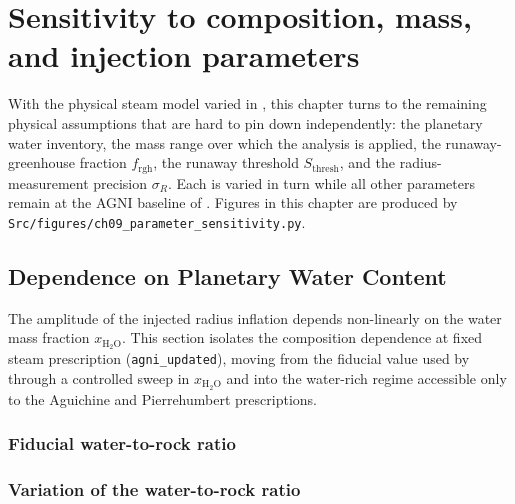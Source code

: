 \chapter{Sensitivity to composition, mass, and injection parameters}
\label{chap:parameter_sensitivity}

With the physical steam model varied in ,
this chapter turns to the remaining physical assumptions that are hard
to pin down independently: the planetary water inventory, the mass
range over which the analysis is applied, the runaway-greenhouse
fraction $f_\mathrm{rgh}$, the runaway threshold
$S_\mathrm{thresh}$, and the radius-measurement precision
$\sigma_R$.  Each is varied in turn while all other parameters remain
at the AGNI baseline of .  Figures in this chapter
are produced by \texttt{Src/figures/ch09\_parameter\_sensitivity.py}.


\section{Dependence on Planetary Water Content}
\label{sec:composition_dependence}

The amplitude of the injected radius inflation depends non-linearly on the
water mass fraction $x_{\mathrm{H_2O}}$.  This section isolates the
composition dependence at fixed steam prescription
(\texttt{agni\_updated}), moving from the fiducial value used by
\textcite{Schlecker2024} through a controlled sweep in
$x_{\mathrm{H_2O}}$ and into the water-rich regime accessible only to the
Aguichine and Pierrehumbert prescriptions.


\subsection{Fiducial water-to-rock ratio}
\label{ssec:wrr_fiducial}



\subsection{Variation of the water-to-rock ratio}
\label{ssec:wrr_sweep}

